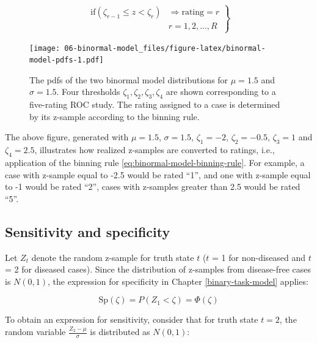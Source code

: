 \documentclass[
]{book}
\begin{document}
\begin{equation}
\left.
\begin{aligned}  
\text{if} \left (\zeta_{r-1} \le z < \zeta_r  \right )&\Rightarrow \text{rating} = r\\
&r = 1, 2, ..., R
\end{aligned}
\right \}
\label{eq:binormal-model-binning-rule}
\end{equation}

\begin{figure}
\centering
\texttt{[image: 06-binormal-model\_files/figure-latex/binormal-model-pdfs-1.pdf]}
\caption{\label{fig:binormal-model-pdfs}The pdfs of the two binormal model distributions for \(\mu = 1.5\) and \(\sigma = 1.5\). Four thresholds \(\zeta_1, \zeta_2, \zeta_3, \zeta_4\) are shown corresponding to a five-rating ROC study. The rating assigned to a case is determined by its z-sample according to the binning rule.}
\end{figure}

The above figure, generated with \(\mu = 1.5\), \(\sigma = 1.5\), \(\zeta_1 = -2\), \(\zeta_2 = -0.5\), \(\zeta_3 = 1\) and \(\zeta_4 = 2.5\), illustrates how realized z-samples are converted to ratings, i.e., application of the binning rule \eqref{eq:binormal-model-binning-rule}. For example, a case with z-sample equal to -2.5 would be rated ``1'', and one with z-sample equal to -1 would be rated ``2'', cases with z-samples greater than 2.5 would be rated ``5''.

\hypertarget{sensitivity-and-specificity-1}{%
\subsection{Sensitivity and specificity}\label{sensitivity-and-specificity-1}}

Let \(Z_t\) denote the random z-sample for truth state \(t\) (\(t\) = 1 for non-diseased and \(t\) = 2 for diseased cases). Since the distribution of z-samples from disease-free cases is \(N(0,1)\), the expression for specificity in Chapter \ref{binary-task-model} applies:

\begin{equation} 
\text{Sp}\left ( \zeta \right )=P\left ( Z_1 < \zeta \right )=\Phi\left ( \zeta \right )
\label{eq:binormal-model-specificity}
\end{equation}

To obtain an expression for sensitivity, consider that for truth state \(t = 2\), the random variable \(\frac{Z_2-\mu}{\sigma}\) is distributed as \(N(0,1)\):
\end{document}
